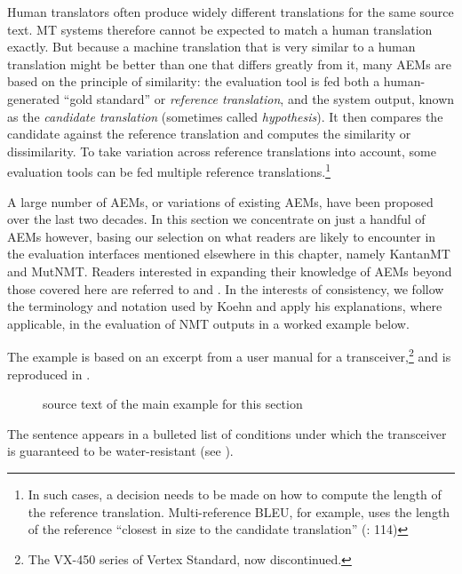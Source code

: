 \documentclass[output=paper]{langscibook}
\begin{document}
Human translators often produce widely different translations for the same source text. MT systems therefore cannot be expected to match a human translation exactly. But because a machine translation that is very similar to a human translation might be better than one that differs greatly from it, many AEMs are based on the principle of similarity: the evaluation tool is fed both a human-generated “gold standard” or \textit{reference translation}, and the system output, known as the \textit{candidate translation} (sometimes called \textit{hypothesis}). It then compares the candidate against the reference translation and computes the similarity or dissimilarity. To take variation across reference translations into account, some evaluation tools can be fed multiple reference translations.\footnote{In such cases, a decision needs to be made on how to compute the length of the reference translation. Multi-reference BLEU, for example, uses the length of the reference “closest in size to the candidate translation” (\citealt{QinSpecia2015}: 114)}

A large number of AEMs, or variations of existing AEMs, have been proposed over the last two decades. In this section we concentrate on just a handful of AEMs however, basing our selection on what readers are likely to encounter in the evaluation interfaces mentioned elsewhere in this chapter, namely KantanMT and MutNMT. Readers interested in expanding their knowledge of AEMs beyond those covered here are referred to \citet{Koehn2010} and \citet{Koehn2010}. In the interests of consistency, we follow the terminology and notation used by Koehn and apply his explanations, where applicable, in the evaluation of NMT outputs in a worked example below.

The example is based on an excerpt from a user manual for a transceiver,\footnote{The VX-450 series of Vertex Standard, now discontinued.} and is reproduced in .

\begin{figure}
\caption{source text of the main example for this section}
\label{fig:rossi:2}
\end{figure}

\begin{sloppypar}
The sentence appears in a bulleted list of conditions under which the transceiver is guaranteed to be water-resistant (see ).
\end{sloppypar}
\end{document}
